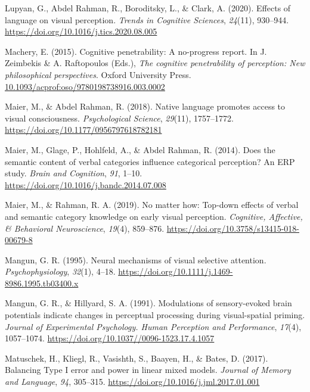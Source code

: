 \documentclass[
  english,
  man,11pt,floatsintext]{apa7}
\begin{document}
\leavevmode\hypertarget{ref-lupyan2020}{}%
Lupyan, G., Abdel Rahman, R., Boroditsky, L., \& Clark, A. (2020). Effects of language on visual perception. \emph{Trends in Cognitive Sciences}, \emph{24}(11), 930--944. \url{https://doi.org/10.1016/j.tics.2020.08.005}

\leavevmode\hypertarget{ref-machery2015}{}%
Machery, E. (2015). Cognitive penetrability: A no-progress report. In J. Zeimbekis \& A. Raftopoulos (Eds.), \emph{The cognitive penetrability of perception: New philosophical perspectives}. Oxford University Press. \url{10.1093/acprof:oso/9780198738916.003.0002}

\leavevmode\hypertarget{ref-maier2018}{}%
Maier, M., \& Abdel Rahman, R. (2018). Native language promotes access to visual consciousness. \emph{Psychological Science}, \emph{29}(11), 1757--1772. \url{https://doi.org/10.1177/0956797618782181}

\leavevmode\hypertarget{ref-maier2014}{}%
Maier, M., Glage, P., Hohlfeld, A., \& Abdel Rahman, R. (2014). Does the semantic content of verbal categories influence categorical perception? An ERP study. \emph{Brain and Cognition}, \emph{91}, 1--10. \url{https://doi.org/10.1016/j.bandc.2014.07.008}

\leavevmode\hypertarget{ref-maier2019}{}%
Maier, M., \& Rahman, R. A. (2019). No matter how: Top-down effects of verbal and semantic category knowledge on early visual perception. \emph{Cognitive, Affective, \& Behavioral Neuroscience}, \emph{19}(4), 859--876. \url{https://doi.org/10.3758/s13415-018-00679-8}

\leavevmode\hypertarget{ref-mangun1995}{}%
Mangun, G. R. (1995). Neural mechanisms of visual selective attention. \emph{Psychophysiology}, \emph{32}(1), 4--18. \url{https://doi.org/10.1111/j.1469-8986.1995.tb03400.x}

\leavevmode\hypertarget{ref-mangun1991}{}%
Mangun, G. R., \& Hillyard, S. A. (1991). Modulations of sensory-evoked brain potentials indicate changes in perceptual processing during visual-spatial priming. \emph{Journal of Experimental Psychology. Human Perception and Performance}, \emph{17}(4), 1057--1074. \url{https://doi.org/10.1037//0096-1523.17.4.1057}

\leavevmode\hypertarget{ref-matuschek2017}{}%
Matuschek, H., Kliegl, R., Vasishth, S., Baayen, H., \& Bates, D. (2017). Balancing Type I error and power in linear mixed models. \emph{Journal of Memory and Language}, \emph{94}, 305--315. \url{https://doi.org/10.1016/j.jml.2017.01.001}
\end{document}
